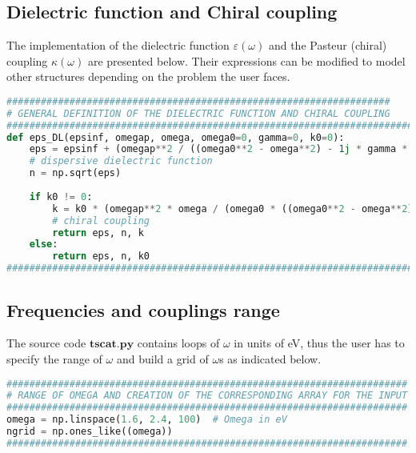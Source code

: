 \documentclass[aps,prl,10pt,onecolumn,superscriptaddress]{revtex4-2}
\begin{document}
\subsection{Dielectric function and Chiral coupling}
The implementation of the dielectric function $\varepsilon\left(\omega\right)$ and the Pasteur (chiral) coupling $\kappa\left(\omega\right)$ are presented below. Their expressions can be modified to model other structures depending on the problem the user faces.
\begin{lstlisting}[language=Python, caption=Implementation of dielectric and chiral dispersive properties.]
###################################################################
# GENERAL DEFINITION OF THE DIELECTRIC FUNCTION AND CHIRAL COUPLING
###############################################################################################
def eps_DL(epsinf, omegap, omega, omega0=0, gamma=0, k0=0):
    eps = epsinf + (omegap**2 / ((omega0**2 - omega**2) - 1j * gamma * omega))  
    # dispersive dielectric function
    n = np.sqrt(eps)
    
    if k0 != 0:
        k = k0 * (omegap**2 * omega / (omega0 * ((omega0**2 - omega**2) - 1j * gamma * omega)))  
        # chiral coupling
        return eps, n, k
    else:
        return eps, n, k0
###############################################################################################
\end{lstlisting}

\subsection{Frequencies and couplings range}
The source code $\mathbf{tscat.py}$ contains loops of $\omega$ in units of eV, thus the user has to specify the range of $\omega$ and build a grid of $\omega$s as indicated below.
\begin{lstlisting}[language=Python, caption=Range of $\omega$ in eV and corresponding grid.]
######################################################################
# RANGE OF OMEGA AND CREATION OF THE CORRESPONDING ARRAY FOR THE INPUT
######################################################################
omega = np.linspace(1.6, 2.4, 100)  # Omega in eV
ngrid = np.ones_like((omega))
######################################################################
\end{lstlisting}
\end{document}
